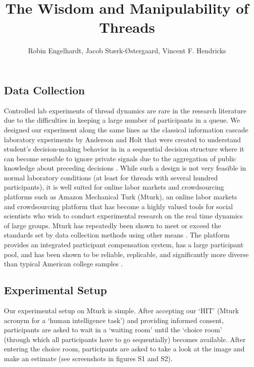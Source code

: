 \documentclass[9pt,twoside,lineno]{pnas-new}
\title{The Wisdom and Manipulability of Threads}
\author{Robin Engelhardt, Jacob Stærk-Østergaard, Vincent F. Hendricks}
\begin{document}

\maketitle

\SItext

\subsection*{Data Collection}
Controlled lab experiments of thread dynamics are rare in the research literature due to the difficulties in keeping a large number of participants in a queue. We designed our experiment along the same lines as the classical information cascade laboratory experiments by Anderson and Holt  that were created to understand student's decision-making behavior in in a sequential decision structure where it can become sensible to ignore private signals due to the aggregation of public knowledge about preceding decisions \cite{anderson1997information}. While such a design is not very feasible in normal laboratory conditions (at least for threads with several hundred participants), it is well suited for online labor markets and crowdsourcing platforms such as Amazon Mechanical Turk (Mturk), an online labor markets and crowdsourcing platform that has become a highly valued tools for social scientists who wish to conduct experimental research on the real time dynamics of large groups. Mturk has repeatedly been shown to meet or exceed the standards set by data collection methods using other means \cite{berinsky2012evaluating, buhrmester2018evaluation}. The platform provides an integrated participant compensation system, has a large participant pool, and has been shown to be reliable, replicable, and significantly more diverse than typical American college samples \cite{mason2009financial, buhrmester2011amazon, crump2013evaluating, rand2012promise, horton2011online}.

\subsection*{Experimental Setup}
Our experimental setup on Mturk is simple. After accepting our ‘HIT’ (Mturk acronym for a ‘human intelligence task’) and providing informed consent, participants are asked to wait in a ‘waiting room’ until the ‘choice room’ (through which all participants have to go sequentially) becomes available. After entering the choice room, participants are asked to take a look at the image and make an estimate (see screenshots in figures S1 and S2).
\end{document}
